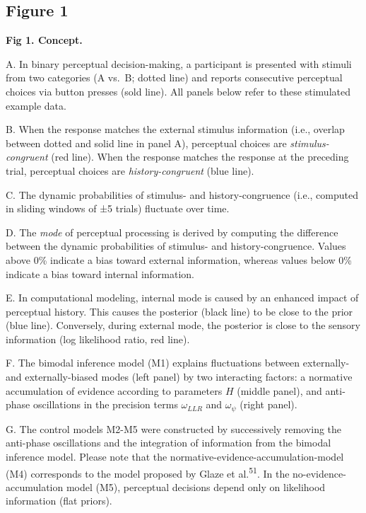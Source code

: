\documentclass[
]{article}
\begin{document}
\hypertarget{figure-1}{%
\subsection{Figure 1}\label{figure-1}}


\textbf{Fig 1. Concept.}

A. In binary perceptual decision-making, a participant is presented with
stimuli from two categories (A vs.~B; dotted line) and reports
consecutive perceptual choices via button presses (sold line). All
panels below refer to these stimulated example data.

B. When the response matches the external stimulus information (i.e.,
overlap between dotted and solid line in panel A), perceptual choices
are \emph{stimulus-congruent} (red line). When the response matches the
response at the preceding trial, perceptual choices are
\emph{history-congruent} (blue line).

C. The dynamic probabilities of stimulus- and history-congruence (i.e.,
computed in sliding windows of ±5 trials) fluctuate over time.

D. The \emph{mode} of perceptual processing is derived by computing the
difference between the dynamic probabilities of stimulus- and
history-congruence. Values above 0\% indicate a bias toward external
information, whereas values below 0\% indicate a bias toward internal
information.

E. In computational modeling, internal mode is caused by an enhanced
impact of perceptual history. This causes the posterior (black line) to
be close to the prior (blue line). Conversely, during external mode, the
posterior is close to the sensory information (log likelihood ratio, red
line).

F. The bimodal inference model (M1) explains fluctuations between
externally- and externally-biased modes (left panel) by two interacting
factors: a normative accumulation of evidence according to parameters
\(H\) (middle panel), and anti-phase oscillations in the precision terms
\(\omega_{LLR}\) and \(\omega_{\psi}\) (right panel).

G. The control models M2-M5 were constructed by successively removing
the anti-phase oscillations and the integration of information from the
bimodal inference model. Please note that the
normative-evidence-accumulation-model (M4) corresponds to the model
proposed by Glaze et al.\textsuperscript{51}. In the
no-evidence-accumulation model (M5), perceptual decisions depend only on
likelihood information (flat priors).
\end{document}
